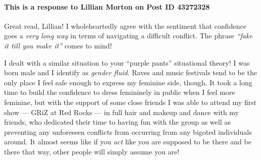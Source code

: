    \paragraph{This is a response to Lillian Morton on Post ID 43272328}
      Great read, Lillian! I wholeheartedly agree with the sentiment that
        confidence goes a \textit{very long way} in terms of navigating a
        difficult conflict. The phrase \textit{``fake it till you make it''}
        comes to mind!

      I dealt with a similar situation to your ``purple pants'' situational
        theory! I was born male and I identify as \textit{gender fluid}. Raves
        and music festivals tend to be the only place I feel safe enough to
        express my feminine side, though. It took a long time to build the
        confidence to dress femininely in public when I feel more feminine, but
        with the support of some close friends I was able to attend my first
        show --- GRiZ at Red Rocks --- in full hair and makeup and dance with my
        friends, who dedicated their time to having fun with the group as well
        as preventing any unforeseen conflicts from occurring from any bigoted
        individuals around. It almost seems like if you \textit{act} like
        you are supposed to be there and be there that way, other people will
        simply assume you are!
